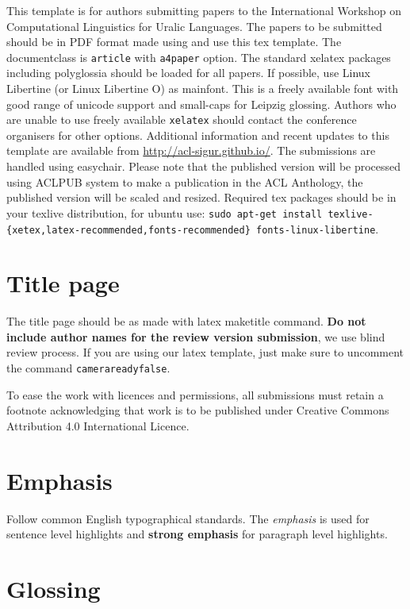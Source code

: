 \documentclass[a4paper,notitlepage]{article}
\begin{document}
This template is for authors submitting papers to the International Workshop on
Computational Linguistics for Uralic Languages. The papers to be submitted
should be in PDF format made using \XeLaTeX{} and use this tex template.  The
documentclass is \texttt{article} with \texttt{a4paper} option.  The standard
xelatex packages including polyglossia should be loaded for all papers. If
possible, use Linux Libertine (or Linux Libertine O) as mainfont.  This is a
freely available font with good range of unicode support and small-caps for
Leipzig glossing.  Authors who are unable to use freely available
\texttt{xelatex} should contact the conference organisers for other options.
Additional information and recent updates to this template are available from
\url{http://acl-sigur.github.io/}. The submissions are handled using easychair.
Please note that the published version will be processed using ACLPUB system
to make a publication in the ACL Anthology, the published version will
be scaled and resized.
Required tex packages should be in your texlive distribution, for ubuntu use:
\texttt{sudo apt-get install
texlive-\{xetex,latex-recommended,fonts-recommended\} fonts-linux-libertine}.


\section{Title page}

The title page should be as made with latex maketitle command. \textbf{Do not
include author names for the review version submission}, we use blind review
process. If you are using our latex template, just make sure to uncomment the
command \texttt{camerareadyfalse}.

To ease the work with licences and permissions, all submissions must retain
a footnote acknowledging that work is to be published under Creative
Commons Attribution 4.0 International Licence.

\section{Emphasis}

Follow common English typographical standards. The \emph{emphasis} is used for
sentence level highlights and \textbf{strong emphasis} for paragraph level
highlights.

\section{Glossing}
\end{document}
